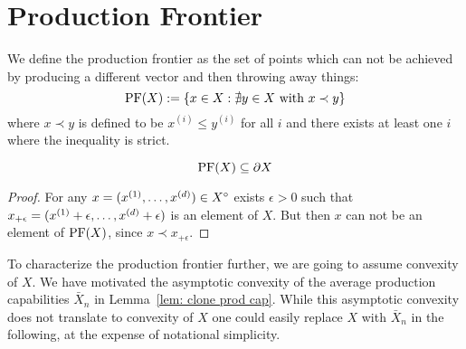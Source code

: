 \section{Production Frontier}
\label{sec: production frontier}

We define the production frontier as the set of points which can not be
achieved by producing a different vector and then throwing away things:
\[
	\operatorname{PF}(X) := \{ x\in X : \nexists y\in X \text{ with } x\prec y\}
\]
where \(x\prec y\) is defined to be \(x^{(i)} \le y^{(i)}\) for all \(i\) and
there exists at least one \(i\) where the inequality is strict.

\begin{lemma}
	\label{lem: prod frontier part of boundary}
	\[
		\operatorname{PF}(X)\subseteq \partial X
	\]
\end{lemma}
\begin{proof}
	For any \(x=(x^{(1)},\dots, x^{(d)})\in X^\circ\) exists \(\epsilon>0\)
	such that \(x_{+\epsilon} = (x^{(1)}+\epsilon, \dots, x^{(d)}+\epsilon)\)
	is an element of \(X\). But then \(x\) can not be an element of \(\operatorname{PF}(X)\),
	since \(x \prec x_{+\epsilon}\).
\end{proof}

To characterize the production frontier further, we are going to assume
convexity of \(X\). We have motivated the asymptotic convexity of the
average production capabilities \(\bar{X}_n\) in Lemma~\ref{lem: clone prod
cap}. While this asymptotic convexity does not translate to convexity of \(X\)
one could easily replace \(X\) with \(\bar{X}_n\) in the following, at the
expense of notational simplicity.

